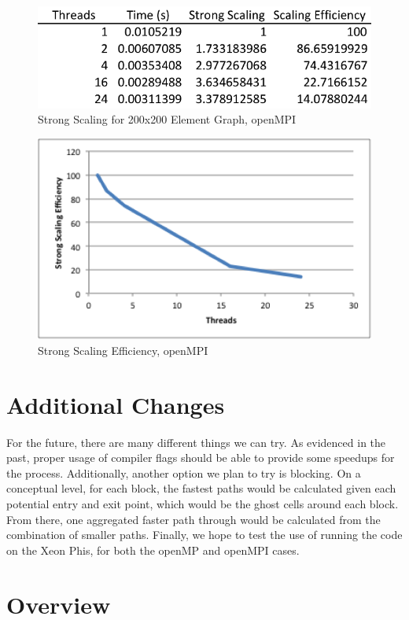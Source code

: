 \documentclass{article}
\begin{document}
	\begin{figure}[h!]
		\begin{center}
			\includegraphics[width=0.5\columnwidth]{st_table_mpi}
			\caption{Strong Scaling for 200x200 Element Graph, openMPI}
			\label{st_mpi_t}
		\end{center}
	\end{figure}
	
	\begin{figure}[h!]
		\begin{center}
			\includegraphics[width=0.7\columnwidth]{st_graph_mpi}
			\caption{Strong Scaling Efficiency, openMPI}
			\label{st_mpi_g}
		\end{center}
	\end{figure}
	
	

\section{Additional Changes}
For the future, there are many different things we can try. As evidenced in the past, proper usage of compiler flags should be able to provide some speedups for the process. Additionally, another option we plan to try is blocking. On a conceptual level, for each block, the fastest paths would be calculated given each potential entry and exit point, which would be the ghost cells around each block. From there, one aggregated faster path through would be calculated from the combination of smaller paths. Finally, we hope to test the use of running the code on the Xeon Phis, for both the openMP and openMPI cases.

\section{Overview}

\begin{thebibliography}{1}

\end{thebibliography}
\end{document}
